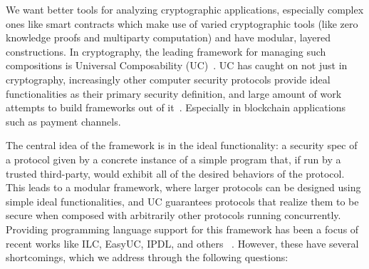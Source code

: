 We want better tools for analyzing cryptographic applications, especially complex ones like smart contracts which make use of varied cryptographic tools (like zero knowledge proofs and multiparty computation) and have modular, layered constructions.
In cryptography, the leading framework for managing such compositions is Universal Composability (UC)~\cite{canettiUC}.
UC has caught on not just in cryptography, increasingly other computer security protocols provide ideal functionalities as their primary security definition, and large amount of work attempts to build frameworks out of it~\cite{suc, gnuc, camenischuc}.
Especially in blockchain applications such as payment channels.

The central idea of the framework is in the ideal functionality: a security spec of a protocol given by a concrete instance of a simple program that, if run by a trusted third-party, would exhibit all of the desired behaviors of the protocol.
This leads to a modular framework, where larger protocols can be designed using simple ideal functionalities, and UC guarantees protocols that realize them to be secure when composed with arbitrarily other protocols running concurrently.
Providing programming language support for this framework has been a focus of recent works like ILC, EasyUC, IPDL, and others~\cite{ilc, easyuc, ipdl, sybolicuc, barbosa} . However, these have several shortcomings, which we address through the following questions:

